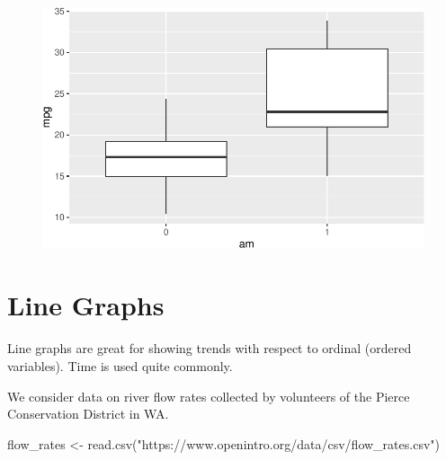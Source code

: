 \documentclass[
  letterpaper,
  DIV=11,
  numbers=noendperiod]{scrartcl}
\newenvironment{Shaded}{\begin{snugshade}}{\end{snugshade}}
\newcommand{\FunctionTok}[1]{\textcolor[rgb]{0.28,0.35,0.67}{#1}}
\newcommand{\NormalTok}[1]{\textcolor[rgb]{0.00,0.23,0.31}{#1}}
\newcommand{\OtherTok}[1]{\textcolor[rgb]{0.00,0.23,0.31}{#1}}
\newcommand{\StringTok}[1]{\textcolor[rgb]{0.13,0.47,0.30}{#1}}
\begin{document}
\begin{figure}[H]

{\centering \includegraphics{118_F_ggplot2_files/figure-pdf/unnamed-chunk-7-1.pdf}

}

\end{figure}

\hypertarget{line-graphs}{%
\section{Line Graphs}\label{line-graphs}}

\begin{tcolorbox}[enhanced jigsaw, arc=.35mm, title=\textcolor{quarto-callout-tip-color}{\faLightbulb}\hspace{0.5em}{Tip}, left=2mm, leftrule=.75mm, toptitle=1mm, opacitybacktitle=0.6, colframe=quarto-callout-tip-color-frame, coltitle=black, opacityback=0, breakable, toprule=.15mm, bottomtitle=1mm, titlerule=0mm, colback=white, rightrule=.15mm, bottomrule=.15mm, colbacktitle=quarto-callout-tip-color!10!white]

Line graphs are great for showing trends with respect to ordinal
(ordered variables). Time is used quite commonly.

\end{tcolorbox}

We consider data on river flow rates collected by volunteers of the
Pierce Conservation District in WA.

\begin{Shaded}
\begin{Highlighting}[]
\NormalTok{flow\_rates }\OtherTok{\textless{}{-}} \FunctionTok{read.csv}\NormalTok{(}\StringTok{"https://www.openintro.org/data/csv/flow\_rates.csv"}\NormalTok{)}
\end{Highlighting}
\end{Shaded}
\end{document}
